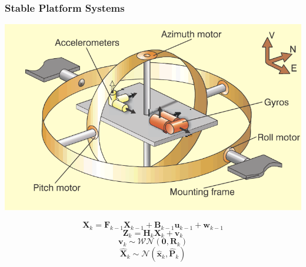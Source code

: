 \documentclass[10pt,a4paper,oneside]{beamer}
\begin{document}
\begin{frame}
	\frametitle{Stable Platform Systems}\cite{King98}
	\includegraphics[scale=0.55]{images/gimbal.png} 
\end{frame}
\begin{frame}
	\begin{equation}
		\textbf{X}_{k} = \textbf{F}_{k-1} \textbf{X}_{k-1} + \textbf{B}_{k-1} 	\textbf{u}_{k-1} + \textbf{w}_{k-1} 
	\end{equation}
	\begin{equation}
		\textbf{Z}_{k} = \textbf{H}_{k} \textbf{X}_{k} + \textbf{v}_{k}
	\end{equation}
	\begin{equation}
		\textbf{v}_{k} \sim \mathcal{WN}(\textbf{0}, \textbf{R}_{k})
	\end{equation}
	\begin{equation}
		\hat{\textbf{X}}_{k} \sim \mathcal N (\hat{\textbf{x}}_{k}, \hat{\textbf{P}}_{k}) 
	\end{equation}
	\end{frame}
\end{document}
